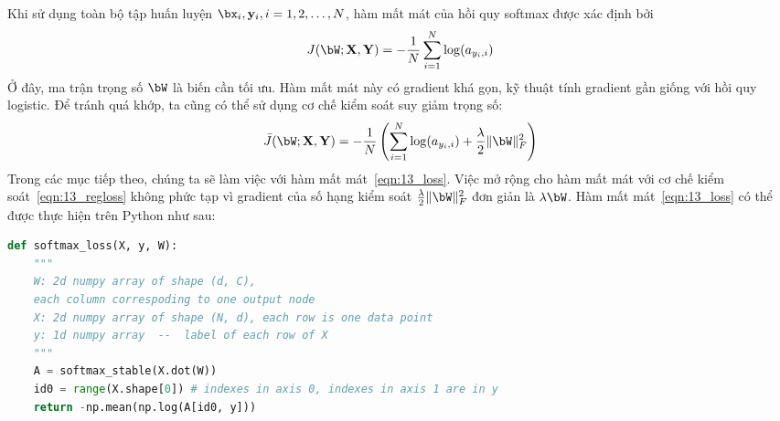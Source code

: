 Khi sử dụng toàn bộ tập huấn luyện $\bx_i, \mathbf{y}_i, i = 1, 2, \dots, N$,
hàm mất mát của hồi quy softmax được xác định bởi
\begin{equation}
\label{eqn:13_loss}
J(\bW; \mathbf{X}, \mathbf{Y}) = -\frac{1}{N}\sum_{i = 1}^N
\log(a_{y_i,i})
\end{equation}
Ở đây, ma trận trọng số $\bW$ là biến cần tối ưu. Hàm mất mát này có gradient khá
gọn, kỹ thuật tính gradient gần giống với hồi quy logistic. Để tránh quá khớp, ta cũng có thể sử dụng cơ chế kiểm soát suy giảm trọng số:
\begin{equation}
\label{eqn:13_regloss}
\bar{J}(\bW; \mathbf{X}, \mathbf{Y}) =
-\frac{1}{N}\left(\sum_{i = 1}^N \log(a_{y_i,i}) + \frac{\lambda}{2} \|\bW\|_F^2 \right)
\end{equation}
Trong các mục tiếp theo, chúng ta sẽ làm việc với hàm mất
mát~\eqref{eqn:13_loss}. Việc mở rộng cho hàm mất mát với
cơ chế kiểm soát~\eqref{eqn:13_regloss} không phức tạp vì gradient của số hạng
kiểm soát $\frac{\lambda}{2}\|\bW\|_F^2$ đơn giản là $\lambda \bW$. Hàm mất
mát~\eqref{eqn:13_loss} có thể được thực hiện trên Python như sau:

\begin{lstlisting}[language=Python]
def softmax_loss(X, y, W):
    """
    W: 2d numpy array of shape (d, C),
    each column correspoding to one output node
    X: 2d numpy array of shape (N, d), each row is one data point
    y: 1d numpy array  --  label of each row of X
    """
    A = softmax_stable(X.dot(W))
    id0 = range(X.shape[0]) # indexes in axis 0, indexes in axis 1 are in y
    return -np.mean(np.log(A[id0, y]))
\end{lstlisting}

